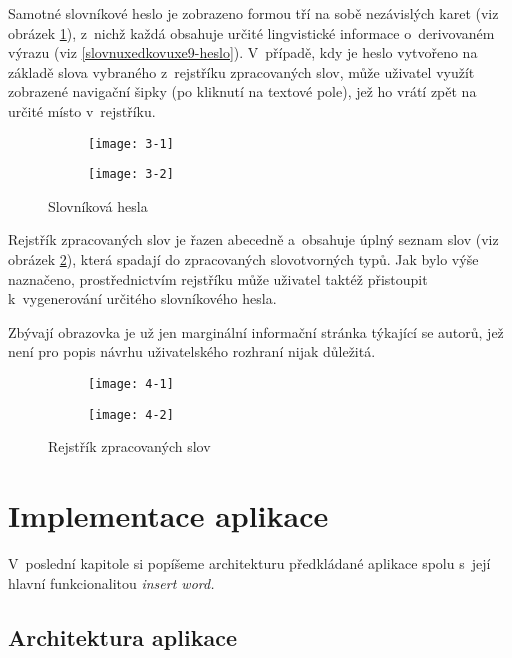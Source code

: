 Samotné slovníkové heslo je zobrazeno formou tří na sobě nezávislých
karet (viz obrázek \ref{3}), z~nichž každá obsahuje určité lingvistické
informace o~derivovaném výrazu (viz \ref{slovnuxedkovuxe9-heslo}).
V~případě, kdy je heslo vytvořeno na základě slova vybraného z~rejstříku
zpracovaných slov, může uživatel využít zobrazené navigační šipky (po
kliknutí na textové pole), jež ho vrátí zpět na určité místo
v~rejstříku.

\begin{figure}[ht]
  \begin{subfigure}[b]{0.45\textwidth}
    \texttt{[image: 3-1]}
  \end{subfigure}
  \hfill
  \begin{subfigure}[b]{0.45\textwidth}
    \texttt{[image: 3-2]}
  \end{subfigure}
  \caption{Slovníková hesla}
  \label{3}
\end{figure}

Rejstřík zpracovaných slov je řazen abecedně a~obsahuje úplný seznam
slov (viz obrázek \ref{4}), která spadají do zpracovaných slovotvorných
typů. Jak bylo výše naznačeno, prostřednictvím rejstříku může uživatel
taktéž přistoupit k~vygenerování určitého slovníkového hesla.

Zbývají obrazovka je už jen marginální informační stránka týkající se
autorů, jež není pro popis návrhu uživatelského rozhraní nijak důležitá.

\begin{figure}[ht]
  \begin{subfigure}[b]{0.45\textwidth}
    \texttt{[image: 4-1]}
  \end{subfigure}
  \hfill
  \begin{subfigure}[b]{0.45\textwidth}
    \texttt{[image: 4-2]}
  \end{subfigure}
  \caption{Rejstřík zpracovaných slov}
  \label{4}
\end{figure}

\hypertarget{implementace-aplikace}{%
\section{Implementace aplikace}\label{implementace-aplikace}}

V~poslední kapitole si popíšeme architekturu předkládané aplikace spolu
s~její hlavní funkcionalitou \emph{insert word.}

\hypertarget{architektura}{%
\subsection*{Architektura aplikace}\label{architektura}}

